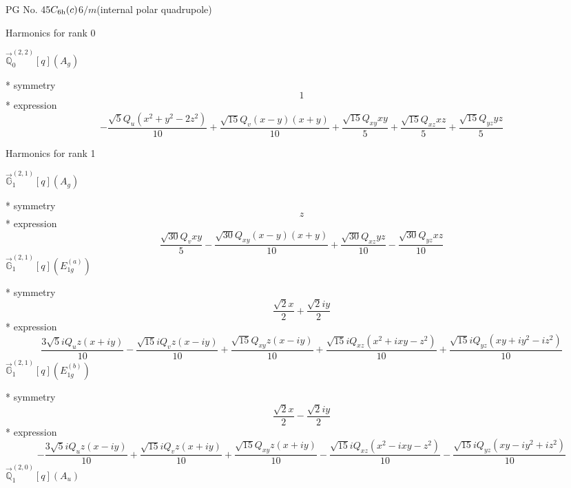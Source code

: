 \documentclass[fleqn,8pt]{jsarticle}
\begin{document}
\setcounter{MaxMatrixCols}{32}

\renewcommand{\tablename}{Table~}
\renewcommand{\figurename}{Figure~}
\begin{center}
\LARGE
PG No. 45\quad$C_{\rm 6h}(c)$\quad$6/m$\quad[ hexagonal ] (internal polar quadrupole)
\end{center}

\noindent * Harmonics for rank 0

\noindent\quad $\vec{\mathbb{Q}}_{0}^{(2,2)}[q](A_{g})$

\noindent\quad ** symmetry
\begin{dmath*}
1
\end{dmath*}
\noindent\quad ** expression
\begin{dmath*}
- \frac{\sqrt{5} Q_{u} \left(x^{2} + y^{2} - 2 z^{2}\right)}{10} + \frac{\sqrt{15} Q_{v} \left(x - y\right) \left(x + y\right)}{10} + \frac{\sqrt{15} Q_{xy} x y}{5} + \frac{\sqrt{15} Q_{xz} x z}{5} + \frac{\sqrt{15} Q_{yz} y z}{5}
\end{dmath*}

\noindent * Harmonics for rank 1

\noindent\quad $\vec{\mathbb{G}}_{1}^{(2,1)}[q](A_{g})$

\noindent\quad ** symmetry
\begin{dmath*}
z
\end{dmath*}
\noindent\quad ** expression
\begin{dmath*}
\frac{\sqrt{30} Q_{v} x y}{5} - \frac{\sqrt{30} Q_{xy} \left(x - y\right) \left(x + y\right)}{10} + \frac{\sqrt{30} Q_{xz} y z}{10} - \frac{\sqrt{30} Q_{yz} x z}{10}
\end{dmath*}
\noindent\quad $\vec{\mathbb{G}}_{1}^{(2,1)}[q](E_{1g}^{(a)})$

\noindent\quad ** symmetry
\begin{dmath*}
\frac{\sqrt{2} x}{2} + \frac{\sqrt{2} i y}{2}
\end{dmath*}
\noindent\quad ** expression
\begin{dmath*}
\frac{3 \sqrt{5} i Q_{u} z \left(x + i y\right)}{10} - \frac{\sqrt{15} i Q_{v} z \left(x - i y\right)}{10} + \frac{\sqrt{15} Q_{xy} z \left(x - i y\right)}{10} + \frac{\sqrt{15} i Q_{xz} \left(x^{2} + i x y - z^{2}\right)}{10} + \frac{\sqrt{15} i Q_{yz} \left(x y + i y^{2} - i z^{2}\right)}{10}
\end{dmath*}
\noindent\quad $\vec{\mathbb{G}}_{1}^{(2,1)}[q](E_{1g}^{(b)})$

\noindent\quad ** symmetry
\begin{dmath*}
\frac{\sqrt{2} x}{2} - \frac{\sqrt{2} i y}{2}
\end{dmath*}
\noindent\quad ** expression
\begin{dmath*}
- \frac{3 \sqrt{5} i Q_{u} z \left(x - i y\right)}{10} + \frac{\sqrt{15} i Q_{v} z \left(x + i y\right)}{10} + \frac{\sqrt{15} Q_{xy} z \left(x + i y\right)}{10} - \frac{\sqrt{15} i Q_{xz} \left(x^{2} - i x y - z^{2}\right)}{10} - \frac{\sqrt{15} i Q_{yz} \left(x y - i y^{2} + i z^{2}\right)}{10}
\end{dmath*}
\noindent\quad $\vec{\mathbb{Q}}_{1}^{(2,0)}[q](A_{u})$
\end{document}
